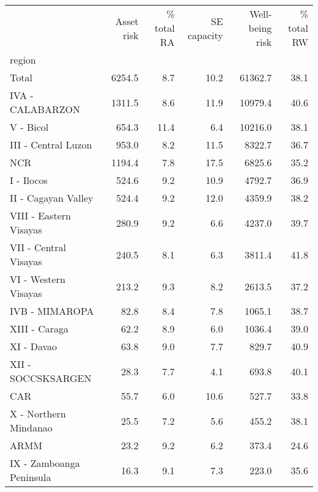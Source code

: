 \begin{tabular}{lrrrrr}
\toprule
{} &  Asset risk &  \% total RA &  SE capacity &  Well-being risk &  \% total RW \\
region                   &             &             &              &                  &             \\
\midrule
Total                    &      6254.5 &         8.7 &         10.2 &          61362.7 &        38.1 \\
IVA - CALABARZON         &      1311.5 &         8.6 &         11.9 &          10979.4 &        40.6 \\
V - Bicol                &       654.3 &        11.4 &          6.4 &          10216.0 &        38.1 \\
III - Central Luzon      &       953.0 &         8.2 &         11.5 &           8322.7 &        36.7 \\
NCR                      &      1194.4 &         7.8 &         17.5 &           6825.6 &        35.2 \\
I - Ilocos               &       524.6 &         9.2 &         10.9 &           4792.7 &        36.9 \\
II - Cagayan Valley      &       524.4 &         9.2 &         12.0 &           4359.9 &        38.2 \\
VIII - Eastern Visayas   &       280.9 &         9.2 &          6.6 &           4237.0 &        39.7 \\
VII - Central Visayas    &       240.5 &         8.1 &          6.3 &           3811.4 &        41.8 \\
VI - Western Visayas     &       213.2 &         9.3 &          8.2 &           2613.5 &        37.2 \\
IVB - MIMAROPA           &        82.8 &         8.4 &          7.8 &           1065.1 &        38.7 \\
XIII - Caraga            &        62.2 &         8.9 &          6.0 &           1036.4 &        39.0 \\
XI - Davao               &        63.8 &         9.0 &          7.7 &            829.7 &        40.9 \\
XII - SOCCSKSARGEN       &        28.3 &         7.7 &          4.1 &            693.8 &        40.1 \\
CAR                      &        55.7 &         6.0 &         10.6 &            527.7 &        33.8 \\
X - Northern Mindanao    &        25.5 &         7.2 &          5.6 &            455.2 &        38.1 \\
ARMM                     &        23.2 &         9.2 &          6.2 &            373.4 &        24.6 \\
IX - Zamboanga Peninsula &        16.3 &         9.1 &          7.3 &            223.0 &        35.6 \\
\bottomrule
\end{tabular}
